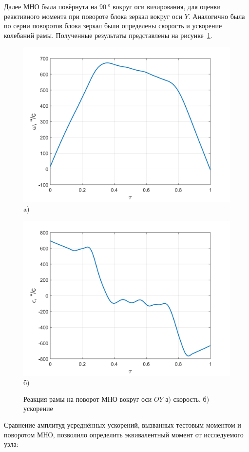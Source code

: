 Далее МНО была повёрнута на $\SI{90}{\degree}$ вокруг оси визирования, для оценки реактивного момента при повороте блока зеркал вокруг оси $Y$. Аналогично была по серии поворотов блока зеркал были определены скорость и ускорение колебаний рамы. Полученные результаты представлены на рисунке~\cref{fig:oy-gyro}.

\begin{figure}[!h]
	\begin{minipage}[b][][b]{0.49\linewidth}\centering
		\includegraphics[width=0.7\linewidth]{matlab/img/oy-gyro.png} \\ a)
	\end{minipage}
	\hfill
	\begin{minipage}[b][][b]{0.49\linewidth}\centering
		\includegraphics[width=0.7\linewidth]{matlab/img/oy-gyro-acc.png} \\ б)
	\end{minipage}
	\caption{Реакция рамы на поворот МНО вокруг оси $OY$ а) скорость, б) ускорение }
	\label{fig:oy-gyro}
\end{figure}


Сравнение амплитуд усреднённых ускорений, вызванных тестовым моментом и поворотом МНО, позволило определить эквивалентный момент от исследуемого узла:

